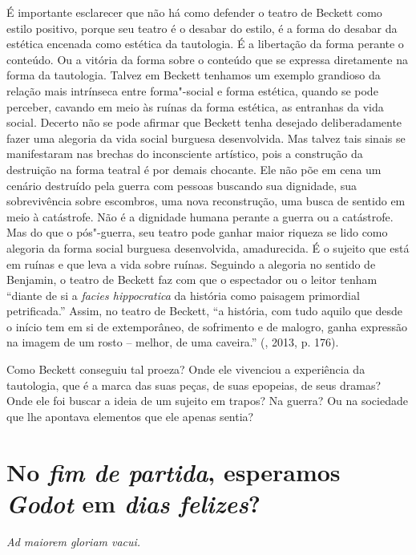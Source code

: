 É importante esclarecer que não há como defender o teatro de Beckett
como estilo positivo, porque seu teatro é o desabar do estilo, é a forma
do desabar da estética encenada como estética da tautologia. É a
libertação da forma perante o conteúdo. Ou a vitória da forma sobre o
conteúdo que se expressa diretamente na forma da tautologia. Talvez em
Beckett tenhamos um exemplo grandioso da relação mais intrínseca entre
forma"-social e forma estética, quando se pode perceber, cavando em meio
às ruínas da forma estética, as entranhas da vida social. Decerto não se
pode afirmar que Beckett tenha desejado deliberadamente fazer uma
alegoria da vida social burguesa desenvolvida. Mas talvez tais sinais se
manifestaram nas brechas do inconsciente artístico, pois a construção da
destruição na forma teatral é por demais chocante. Ele não põe em cena
um cenário destruído pela guerra com pessoas buscando sua dignidade, sua
sobrevivência sobre escombros, uma nova reconstrução, uma busca de
sentido em meio à catástrofe. Não é a dignidade humana perante a guerra
ou a catástrofe. Mas do que o pós"-guerra, seu teatro pode ganhar maior
riqueza se lido como alegoria da forma social burguesa desenvolvida,
amadurecida. É o sujeito que está em ruínas e que leva a vida sobre
ruínas. Seguindo a alegoria no sentido de Benjamin, o teatro de Beckett
faz com que o espectador ou o leitor tenham ``diante de si a
\emph{facies hippocratica} da história como paisagem primordial
petrificada.'' Assim, no teatro de Beckett, ``a história, com tudo
aquilo que desde o início tem em si de extemporâneo, de sofrimento e de
malogro, ganha expressão na imagem de um rosto -- melhor, de uma
caveira.'' (, 2013, p. 176).

Como Beckett conseguiu tal proeza? Onde ele vivenciou a experiência da
tautologia, que é a marca das suas peças, de suas epopeias, de seus
dramas? Onde ele foi buscar a ideia de um sujeito em trapos? Na guerra?
Ou na sociedade que lhe apontava elementos que ele apenas sentia?

\section*{No \emph{fim de partida}, esperamos \emph{Godot} em \emph{dias felizes}?}

\emph{Ad maiorem gloriam vacui.}

